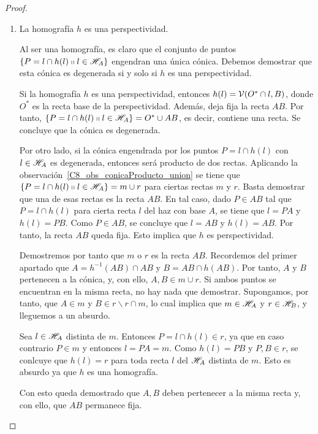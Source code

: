 \begin{proof}
\begin{enumerate}
		\item La homografía $h$ es una perspectividad. 
		
		Al ser una homografía, es claro que el conjunto de puntos $\{P=l\cap h(l)\shortparallel l\in \mathscr{H}_A\}$ engendran una única cónica. Debemos demostrar que esta cónica es degenerada si y solo si $h$ es una perspectividad.
		
		Si la homografía $h$ es una perspectividad, entonces $h(l)=\mathcal{V}(O^*\cap l,B)$, donde $O^*$ es la recta base de la perspectividad. Además, deja fija la recta $AB$. Por tanto, $\{P=l\cap h(l)\shortparallel l\in \mathscr{H}_A\}=O^*\cup AB$, es decir, contiene una recta. Se concluye que la cónica es degenerada.
		
		Por otro lado, si la cónica engendrada por los puntos $P=l\cap h(l)$ con $l\in\mathscr{H}_A$ es degenerada, entonces será producto de dos rectas. Aplicando la observación~\ref{C8_obs_conicaProducto_union} se tiene que $\{P=l\cap h(l)\shortparallel l\in \mathscr{H}_A\}=m\cup r$ para ciertas rectas $m$ y $r$. Basta demostrar que una de esas rectas es la recta $AB$. En tal caso, dado $P\in AB$ tal que $P=l\cap h(l)$ para cierta recta $l$ del haz con base $A$, se tiene que $l=PA$ y $h(l)=PB$. Como $P\in AB$, se concluye que $l=AB$ y $h(l)=AB$. Por tanto, la recta $AB$ queda fija. Esto implica que $h$ es perspectividad.
		
		Demostremos por tanto que $m$ o $r$ es la recta $AB$. Recordemos del primer apartado que $A=h^{-1}(AB)\cap AB$ y $B=AB\cap h(AB)$. Por tanto, $A$ y $B$ pertenecen a la cónica, y, con ello, $A,B\in m\cup r$. Si ambos puntos se encuentran en la misma recta, no hay nada que demostrar. Supongamos, por tanto, que $A\in m$ y $B\in r\backslash r\cap m$, lo cual implica que $m\in \mathscr{H}_A$ y $r\in \mathscr{H}_B$, y lleguemos a un absurdo.
		
		Sea $l\in \mathscr{H}_A$ distinta de $m$. Entonces $P=l\cap h(l)\in r$, ya que en caso contrario $P\in m$ y entonces $l=PA=m$. Como $h(l)=PB$ y $P,B\in r$, se conlcuye que $h(l)=r$ para toda recta $l$ del $\mathscr{H}_A$ distinta de $m$. Esto es absurdo ya que $h$ es una homografía.
		
		Con esto queda demostrado que $A,B$ deben pertenecer a la misma recta y, con ello, que $AB$ permanece fija.
	\end{enumerate}
\end{proof}
